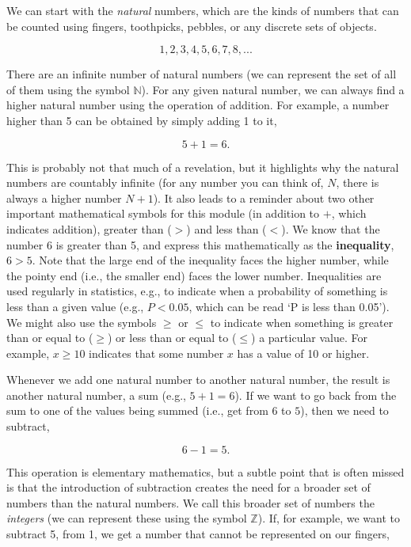 \documentclass[
]{scrbook}
\begin{document}
We can start with the \emph{natural} numbers, which are the kinds of numbers that can be counted using fingers, toothpicks, pebbles, or any discrete sets of objects.

\[1, 2, 3, 4, 5, 6, 7, 8, ...\]

There are an infinite number of natural numbers (we can represent the set of all of them using the symbol \(\mathbb{N}\)).
For any given natural number, we can always find a higher natural number using the operation of addition.
For example, a number higher than 5 can be obtained by simply adding 1 to it,

\[5 + 1 = 6.\]

This is probably not that much of a revelation, but it highlights why the natural numbers are countably infinite (for any number you can think of, \(N\), there is always a higher number \(N + 1\)).
It also leads to a reminder about two other important mathematical symbols for this module (in addition to \(+\), which indicates addition), greater than (\(>\)) and less than (\(<\)).
We know that the number 6 is greater than 5, and express this mathematically as the \textbf{inequality}, \(6 > 5\).
Note that the large end of the inequality faces the higher number, while the pointy end (i.e., the smaller end) faces the lower number.
Inequalities are used regularly in statistics, e.g., to indicate when a probability of something is less than a given value (e.g., \(P < 0.05\), which can be read `P is less than 0.05').
We might also use the symbols \(\geq\) or \(\leq\) to indicate when something is greater than or equal to (\(\geq\)) or less than or equal to (\(\leq\)) a particular value.
For example, \(x \geq 10\) indicates that some number \(x\) has a value of 10 or higher.

Whenever we add one natural number to another natural number, the result is another natural number, a sum (e.g., \(5 + 1 = 6\)).
If we want to go back from the sum to one of the values being summed (i.e., get from \(6\) to \(5\)), then we need to subtract,

\[6 - 1 = 5.\]

This operation is elementary mathematics, but a subtle point that is often missed is that the introduction of subtraction creates the need for a broader set of numbers than the natural numbers.
We call this broader set of numbers the \emph{integers} (we can represent these using the symbol \(\mathbb{Z}\)).
If, for example, we want to subtract 5, from 1, we get a number that cannot be represented on our fingers,
\end{document}
